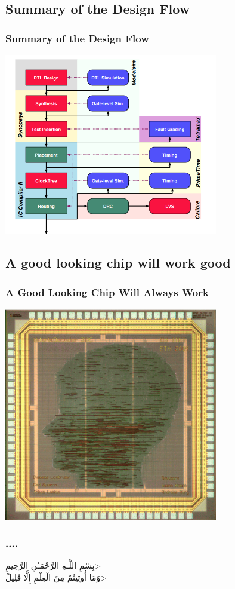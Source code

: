 \documentclass[compress]{beamer}
\begin{document}
\subsection[Summary]{Summary of the Design Flow}
\begin{frame}
	\frametitle{Summary of the Design Flow}
	\begin{center}
		\includegraphics[width=0.7\textwidth]{summary}
	\end{center}
\end{frame}
\subsection[Nice]{A good looking chip will work good}
\begin{frame}
	\frametitle{A Good Looking Chip Will Always Work}
	\begin{center}
		\includegraphics[width=0.7\textwidth]{Final}
	\end{center}
\end{frame}
	\begin{frame}
	\frametitle{....}
	\begin{center}
		\<بِسْمِ اللَّـهِ الرَّحْمَـٰنِ الرَّحِيمِ> \\
		\<وَمَا أُوتِيتُمْ مِنَ الْعِلْمِ إِلَّا قَلِيلً>
		
	\end{center}
\end{frame}
\end{document}
